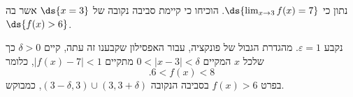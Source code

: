 נתון כי
$\ds{\lim_{x \to 3} f(x)  =  7}$. הוכיחו כי קיימת סביבה נקובה של
$ \ds{x  =  3} $
אשר בה
$ \ds{f(x)  >  6} $.
\ifsol
{}
\begin{solbox}
נקבע
$\varepsilon=1$.
מהגדרת הגבול של פונקציה, עבור האפסילון שקבענו זה עתה, קיים
$\delta>0$
כך שלכל $x$ המקיים
$0<|x-3|<\delta$
מתקיים
$|f(x)-7|<1$,
כלומר
$$.6<f(x)<8$$
בפרט
$f(x)>6$
בסביבה הנקובה
$(3-\delta,3)\cup(3,3+\delta)$,
כמבוקש.
\end{solbox}
\fi
